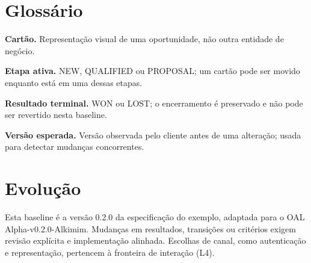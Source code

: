 \documentclass[10pt,a4paper]{article}
\begin{document}
\section{Glossário}

\textbf{Cartão.} Representação visual de uma oportunidade, não outra entidade de negócio.

\textbf{Etapa ativa.} NEW, QUALIFIED ou PROPOSAL; um cartão pode ser movido enquanto está em uma dessas etapas.

\textbf{Resultado terminal.} WON ou LOST; o encerramento é preservado e não pode ser revertido nesta baseline.

\textbf{Versão esperada.} Versão observada pelo cliente antes de uma alteração; usada para detectar mudanças concorrentes.

\section{Evolução}

Esta baseline é a versão 0.2.0 da especificação do exemplo, adaptada para o OAL Alpha-v0.2.0-Alkimim. Mudanças em resultados, transições ou critérios exigem revisão explícita e implementação alinhada. Escolhas de canal, como autenticação e representação, pertencem à fronteira de interação (L4).
\end{document}
